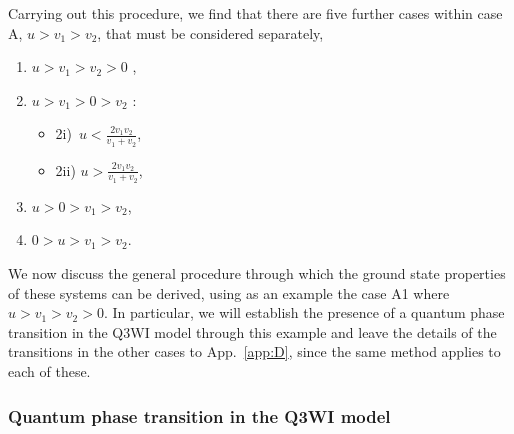 \documentclass[aps,pra,
superscriptaddress,
reprint,twocolumn,preprintnumbers,
amsmath,amssymb,
nofootinbib]{revtex4-1}
\begin{document}
Carrying out this procedure, we find that there are five further cases within case A, $u>v_1>v_2$, that must be considered separately,
\begin{enumerate}
\item $u>v_1>v_2>0$ ,
\item $u>v_1>0>v_2$ :
\begin{itemize}
\item[] 2i) \,$u < \frac{2 v_1 v_2}{v_1+v_2}$,
\item[] 2ii) $u > \frac{2 v_1 v_2}{v_1+v_2}$,
\end{itemize}
\item $u>0>v_1>v_2$,
\item $0>u>v_1>v_2$.
\end{enumerate}

We now discuss the general procedure through which the ground state properties of these systems can be derived, using as an example the case A1 where $u>v_1>v_2>0$. In particular, we will establish the presence of a quantum phase transition in the Q3WI model through this example and leave the details of the transitions in the other cases to App.~\ref{app:D}, since the same method applies to each of these. 

\subsubsection*{Quantum phase transition in the Q3WI model}
\end{document}

